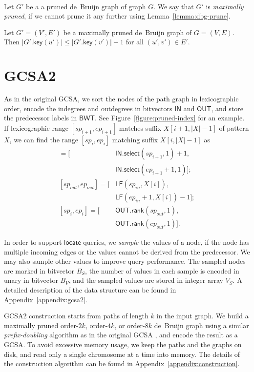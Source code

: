 \documentclass[twoside,leqno,twocolumn]{article}
\newcommand{\abs}[1]{\ensuremath{\lvert #1 \rvert}}
\newcommand{\rank}{\ensuremath{\mathsf{rank}}}
\newcommand{\select}{\ensuremath{\mathsf{select}}}
\newcommand{\LF}{\ensuremath{\mathsf{LF}}}
\newcommand{\locate}{\ensuremath{\mathsf{locate}}}
\newcommand{\gkey}{\ensuremath{\mathsf{key}}}
\newcommand{\orderk}[1]{order\nobreakdash-$#1$}
\newcommand{\BWT}{\ensuremath{\mathsf{BWT}}}
\newcommand{\bvIN}{\ensuremath{\mathsf{IN}}}
\newcommand{\bvOUT}{\ensuremath{\mathsf{OUT}}}
\begin{document}
\begin{Definition} ~\\
Let $G'$ be a a pruned de~Bruijn graph of graph $G$. We say that $G'$ is \emph{maximally pruned}, if we cannot prune it any further using Lemma~\ref{lemma:dbg-prune}.
\end{Definition}

\begin{lemma}\label{lemma:dbg-maximal}
Let $G' = (V', E')$ be a maximally pruned de~Bruijn graph of $G = (V, E)$. Then $\abs{G'.\gkey(u')} \le \abs{G'.\gkey(v')}+1$ for all $(u', v') \in E'$.
\end{lemma}


\section{GCSA2}

As in the original GCSA, we sort the nodes of the path graph in lexicographic order, encode the indegrees and outdegrees in bitvectors $\bvIN$ and $\bvOUT$, and store the predecessor labels in $\BWT$. See Figure~\ref{figure:pruned-index} for an example. If lexicographic range $[sp_{i+1}, ep_{i+1}]$ matches suffix $X[i+1, \abs{X}-1]$ of pattern $X$, we can find the range $[sp_{i}, ep_{i}]$ matching suffix $X[i, \abs{X}-1]$ as
\begin{align*}
[sp_{in}, ep_{in}] = [&\bvIN.\select(sp_{i+1}, 1) + 1, \\
 & \bvIN.\select(ep_{i+1}+1, 1)]; \\
[sp_{out}, ep_{out}] = [&\LF(sp_{in}, X[i]), \\
 & \LF(ep_{in}+1, X[i]) - 1]; \\
[sp_{i}, ep_{i}] = [&\bvOUT.\rank(sp_{out}, 1), \\
 & \bvOUT.\rank(ep_{out}, 1)].
\end{align*}

In order to support $\locate$ queries, we \emph{sample} the values of a node, if the node has multiple incoming edges or the values cannot be derived from the predecessor. We may also sample other values to improve query performance. The sampled nodes are marked in bitvector $B_{S}$, the number of values in each sample is encoded in unary in bitvector $B_{V}$, and the sampled values are stored in integer array $V_{S}$. A detailed description of the data structure can be found in Appendix~\ref{appendix:gcsa2}.

GCSA2 construction starts from paths of length $k$ in the input graph. We build a maximally pruned \orderk{2k}, \orderk{4k}, or \orderk{8k} de~Bruijn graph using a similar \emph{prefix-doubling} algorithm as in the original GCSA \cite{Siren2014}, and encode the result as a GCSA. To avoid excessive memory usage, we keep the paths and the graphs on disk, and read only a single chromosome at a time into memory. The details of the construction algorithm can be found in Appendix~\ref{appendix:construction}.
\end{document}

